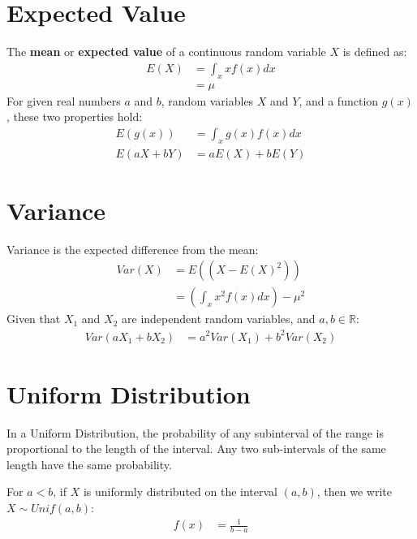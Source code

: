             \section{Expected Value} %
            \label{sec:expected_value}
                The \textbf{mean} or \textbf{expected value} of a continuous random variable $X$ is defined as:
                \begin{align*}
                    E(X) &= \int_x xf(x) dx \\
                    &= \mu
                \end{align*}
                For given real numbers $a$ and $b$, random variables $X$ and $Y$, and a function $g(x)$, these two properties hold:
                \begin{align*}
                    E(g(x)) &= \int_x g(x) f(x) dx \\
                    E(aX + bY) &= a E(X) + b E(Y)
                \end{align*}
            \section{Variance} %
            \label{sec:variance}
                Variance is the expected difference from the mean:
                \begin{align*}
                    Var(X) &= E((X - E(X)^2)) \\
                    &= \left(\int_x x^2 f(x) dx \right) - \mu^2
                \end{align*}
                Given that $X_1$ and $X_2$ are independent random variables, and $a , b \in \mathbb{R}$:
                \begin{align*}
                    Var(a X_1 + b X_2) &= a^2 Var(X_1) + b^2 Var(X_2)
                \end{align*}
            \section{Uniform Distribution} %
            \label{sec:uniform_distribution}
                In a Uniform Distribution, the probability of any subinterval of the range is proportional to the length of the interval.
                Any two sub-intervals of the same length have the same probability.

                For $a < b$, if $X$ is uniformly distributed on the interval $(a, b)$, then we write $X \sim Unif(a, b)$:
                \begin{align*}
                    f(x) &= \frac{1}{b - a} \\
                \end{align*}


